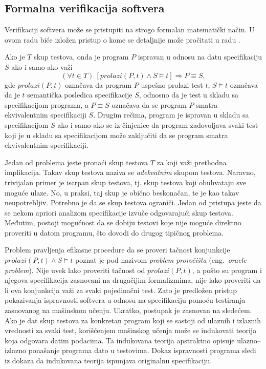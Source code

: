 \documentclass[a4paper]{article}
\theoremstyle{definition}
\begin{document}
{\subsection{Formalna verifikacija softvera}
\label{subsec:formalna-verifikacija}

\par Verifikaciji softvera može se pristupiti na strogo formalan matematički način. U ovom radu biće izložen pristup o kome se detaljnije može pročitati u radu \cite{verify}.

\par Ako je $T$ skup testova, onda je program $P$ ispravan u odnosu na datu specifikaciju $S$ ako i samo ako važi
$$(\forall t\in T)\ [prolazi(P,t)\wedge S\models t]\Rightarrow P\equiv S,$$
gde $prolazi(P,t)$ označava da program $P$ uspešno prolazi test $t$, $S\models t$ označava da je $t$ semantička posledica specifikacije $S$, odnosno da je test u skladu sa specifikacijom programa, a $P\equiv S$ označava da se program $P$ smatra ekvivalentnim specifikaciji $S$. Drugim rečima, program je ispravan u skladu sa specifikacijom $S$ ako i samo ako se iz činjenice da program zadovoljava svaki test koji je u skladu sa specifikacijom može zaključiti da se program smatra ekvivalentnim specifikaciji.

\par Jedan od problema jeste pronaći skup testova $T$ za koji važi prethodna implikacija. Takav skup testova naziva se \emph{adekvatnim} skupom testova. Naravno, trivijalan primer je iscrpan skup testova, tj. skup testova koji obuhvataju sve moguće ulaze. No, u praksi, taj skup je obično beskonačan, te je kao takav neupotrebljiv. Potrebno je da se skup testova ograniči. Jedan od pristupa jeste da se nekom apriori analizom specifikacije izvuče odgovarajući skup testova. Međutim, postoji mogućnost da se dobiju testovi koje nije moguće direktno proveriti u datom programu, što dovodi do drugog tipičnog problema.

\par Problem pravljenja efikasne procedure da se proveri tačnost konjunkcije $prolazi(P,t)\wedge S\models t$ poznat je pod nazivom \emph{problem proročišta} (eng.~{\em oracle problem}). Nije uvek lako proveriti tačnost od $prolazi(P,t)$, a pošto su program i njegova specifikacija zasnovani na drugačijim formalizmima, nije lako proveriti da li ova konjunkcija važi za svaki pojedinačni test. Zato je predložen pristup pokazivanja ispravnosti softvera u odnosu na specifikaciju pomoću testiranja zasnovanog na mašinskom učenju. Ukratko, postupak je zasnovan na sledećem. Ako je dat skup testova za konkretan program koji se sastoji od ulaznih i izlaznih vrednosti za svaki test, korišćenjem mašinskog učenja može se indukovati teorija koja odgovara datim podacima. Ta indukovana teorija apstraktno opisuje ulazno--izlazno ponašanje programa dato u testovima. Dokaz ispravnosti programa sledi iz dokaza da indukovana teorija ispunjava originalnu specifikaciju.

}
\end{document}
